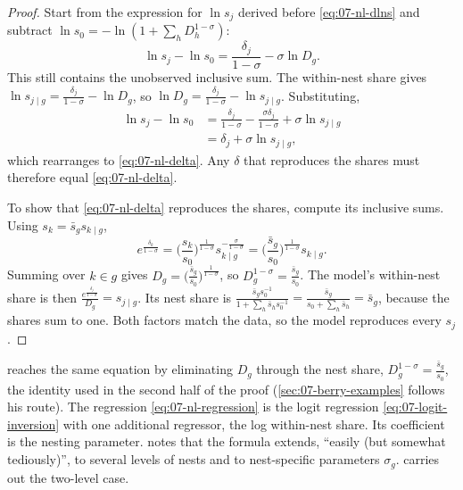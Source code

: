 \begin{proof}
Start from the expression for $\ln s_j$ derived before \eqref{eq:07-nl-dlns} and subtract
$\ln s_0 = -\ln(1 + \sum_h D_h^{1-\sigma})$:
\begin{equation*}
\ln s_j - \ln s_0 = \frac{\delta_j}{1-\sigma} - \sigma\ln D_g .
\end{equation*}
This still contains the unobserved inclusive sum. The within-nest share gives
$\ln s_{j \mid g} = \frac{\delta_j}{1-\sigma} - \ln D_g$, so
$\ln D_g = \frac{\delta_j}{1-\sigma} - \ln s_{j \mid g}$. Substituting,
\begin{align*}
\ln s_j - \ln s_0 &= \frac{\delta_j}{1-\sigma} - \frac{\sigma\delta_j}{1-\sigma} + \sigma\ln s_{j \mid g} \\
&= \delta_j + \sigma\ln s_{j \mid g} ,
\end{align*}
which rearranges to \eqref{eq:07-nl-delta}. Any $\delta$ that reproduces the shares must therefore equal
\eqref{eq:07-nl-delta}.

To show that \eqref{eq:07-nl-delta} reproduces the shares, compute its inclusive sums. Using
$s_k = \bar s_g s_{k \mid g}$,
\begin{equation*}
e^{\frac{\delta_k}{1-\sigma}} = \Big(\frac{s_k}{s_0}\Big)^{\frac{1}{1-\sigma}}s_{k \mid g}^{-\frac{\sigma}{1-\sigma}}
= \Big(\frac{\bar s_g}{s_0}\Big)^{\frac{1}{1-\sigma}}s_{k \mid g} .
\end{equation*}
Summing over $k \in g$ gives $D_g = \big(\frac{\bar s_g}{s_0}\big)^{\frac{1}{1-\sigma}}$, so
$D_g^{1-\sigma} = \frac{\bar s_g}{s_0}$. The model's within-nest share is then
$\frac{e^{\frac{\delta_j}{1-\sigma}}}{D_g} = s_{j \mid g}$. Its nest share is
$\frac{\bar s_g s_0^{-1}}{1 + \sum_h \bar s_h s_0^{-1}} = \frac{\bar s_g}{s_0 + \sum_h \bar s_h} = \bar s_g$, because the
shares sum to one. Both factors match the data, so the model reproduces every $s_j$.
\end{proof}

\citet[eqs.~26--28, p.~253]{Berry1994} reaches the same equation by eliminating $D_g$ through the nest share,
$D_g^{1-\sigma} = \frac{\bar s_g}{s_0}$, the identity used in the second half of the proof
(\cref{sec:07-berry-examples} follows his route). The regression \eqref{eq:07-nl-regression} is the logit
regression \eqref{eq:07-logit-inversion} with one additional regressor, the log within-nest share. Its coefficient is the nesting parameter. \citet[n.~7]{Berry1994} notes that
the formula extends, ``easily (but somewhat tediously)'', to several levels of nests and to nest-specific
parameters $\sigma_g$.  carries out the two-level case.


